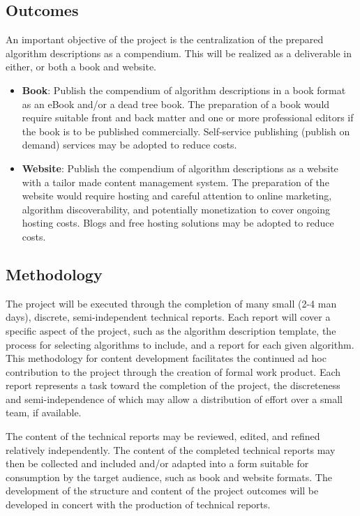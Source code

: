\documentclass[a4paper, 11pt]{article}
\begin{document}
\subsection{Outcomes}
An important objective of the project is the centralization of the prepared algorithm descriptions as a compendium. This will be realized as a deliverable in either, or both a book and website.

\begin{itemize}
	\item \textbf{Book}: Publish the compendium of algorithm descriptions in a book format as an eBook and/or a dead tree book. The preparation of a book would require suitable front and back matter and one or more professional editors if the book is to be published commercially. Self-service publishing (publish on demand) services may be adopted to reduce costs.
	\item \textbf{Website}: Publish the compendium of algorithm descriptions as a website with a tailor made content management system. The preparation of the website would require hosting and careful attention to online marketing, algorithm discoverability, and potentially monetization to cover ongoing hosting costs. Blogs and free hosting solutions may be adopted to reduce costs.
\end{itemize} 

\subsection{Methodology}
The project will be executed through the completion of many small (2-4 man days), discrete, semi-independent technical reports. Each report will cover a specific aspect of the project, such as the algorithm description template, the process for selecting algorithms to include, and a report for each given algorithm. This methodology for content development facilitates the continued ad hoc contribution to the project through the creation of formal work product. Each report represents a task toward the completion of the project, the discreteness and semi-independence of which may allow a distribution of effort over a small team, if available.

The content of the technical reports may be reviewed, edited, and refined relatively independently. The content of the completed technical reports may then be collected and included and/or adapted into a form suitable for consumption by the target audience, such as book and website formats. The development of the structure and content of the project outcomes will be developed in concert with the production of technical reports.
\end{document}
